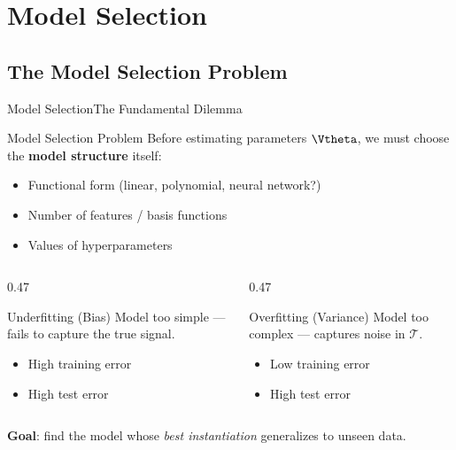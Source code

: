 \section{Model Selection}

\subsection{The Model Selection Problem}

\begin{frame}{Model Selection}{The Fundamental Dilemma}
  \begin{block}{Model Selection Problem}
    Before estimating parameters $\Vtheta$, we must choose the \textbf{model structure} itself:
    \begin{itemize}
      \item Functional form (linear, polynomial, neural network?)
      \item Number of features / basis functions
      \item Values of hyperparameters
    \end{itemize}
  \end{block}

  \begin{columns}
    \begin{column}{0.47\textwidth}
      \begin{alertblock}{Underfitting (Bias)}
        Model too simple — fails to capture the true signal.
        \begin{itemize}
          \item High training error
          \item High test error
        \end{itemize}
      \end{alertblock}
    \end{column}
    \begin{column}{0.47\textwidth}
      \begin{alertblock}{Overfitting (Variance)}
        Model too complex — captures noise in $\mathcal{T}$.
        \begin{itemize}
          \item Low training error
          \item High test error
        \end{itemize}
      \end{alertblock}
    \end{column}
  \end{columns}

  \bigskip
  \textbf{Goal}: find the model whose \emph{best instantiation} generalizes to unseen data.
\end{frame}


